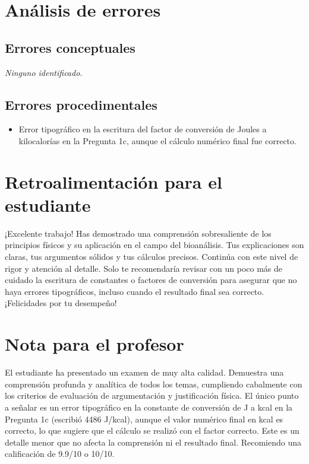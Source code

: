 \documentclass[11pt,a4paper]{article}
\begin{document}
\section*{Análisis de errores}

\subsection*{Errores conceptuales}
\textit{Ninguno identificado.}

\subsection*{Errores procedimentales}
\begin{itemize}[leftmargin=1.5em, itemsep=2pt]
  \item Error tipográfico en la escritura del factor de conversión de Joules a kilocalorías en la Pregunta 1c, aunque el cálculo numérico final fue correcto.
\end{itemize}

\section*{Retroalimentación para el estudiante}
\begin{tcolorbox}[cajaRecomendacion, title={Dirigido a: Mariana Rojas}]
¡Excelente trabajo! Has demostrado una comprensión sobresaliente de los principios físicos y su aplicación en el campo del bioanálisis. Tus explicaciones son claras, tus argumentos sólidos y tus cálculos precisos. Continúa con este nivel de rigor y atención al detalle. Solo te recomendaría revisar con un poco más de cuidado la escritura de constantes o factores de conversión para asegurar que no haya errores tipográficos, incluso cuando el resultado final sea correcto. ¡Felicidades por tu desempeño!
\end{tcolorbox}

\section*{Nota para el profesor}
\begin{tcolorbox}[
  enhanced, breakable,
  colback=yellow!8, colframe=yellow!60!black,
  fonttitle=\bfseries, coltitle=black,
  title={Observaciones para revisión manual},
  top=4pt, bottom=4pt, left=8pt, right=8pt,
]
El estudiante ha presentado un examen de muy alta calidad. Demuestra una comprensión profunda y analítica de todos los temas, cumpliendo cabalmente con los criterios de evaluación de argumentación y justificación física. El único punto a señalar es un error tipográfico en la constante de conversión de J a kcal en la Pregunta 1c (escribió 4486 J/kcal), aunque el valor numérico final en kcal es correcto, lo que sugiere que el cálculo se realizó con el factor correcto. Este es un detalle menor que no afecta la comprensión ni el resultado final. Recomiendo una calificación de 9.9/10 o 10/10.
\end{tcolorbox}
\end{document}
